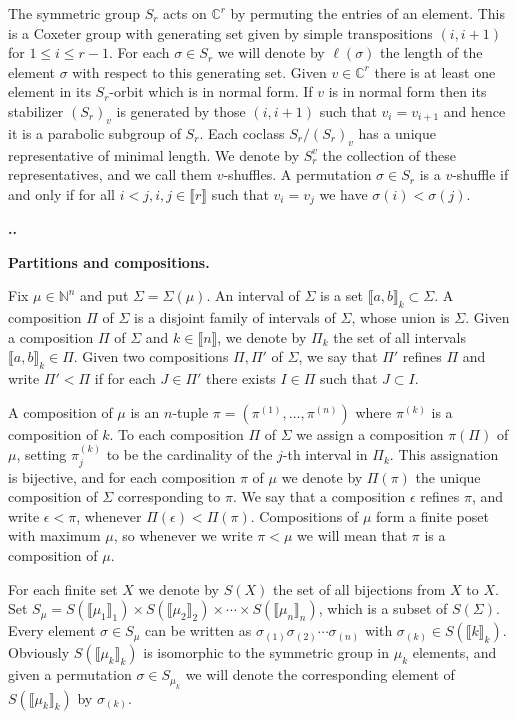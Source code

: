 \documentclass[11pt,fleqn]{amsart}
\renewcommand\thesection{\arabic{section}}
\newcounter{para}[section]
\renewcommand\thepara{\thesection.\arabic{para}}
\def\paragraph{%
 \noindent
 \refstepcounter{para}%
 \textbf{\thepara.}\hspace{1ex}%
}
\newcommand\about[1]{%
 {\bfseries#1.}%
}
\newcommand\NN{\mathbb N}
\newcommand\CC{\mathbb C}
\newcommand\interval[1]{\llbracket #1 \rrbracket}
\begin{document}
The symmetric group $S_r$ acts on $\CC^r$ by permuting the entries of an 
element. This is a Coxeter group with generating set given by simple 
transpositions $(i,i+1)$ for $1 \leq i \leq r-1$. For each $\sigma \in S_r$
we will denote by $\ell(\sigma)$ the length of the element $\sigma$ with 
respect to this generating set. Given $v \in \CC^r$ there is at least one 
element in its $S_r$-orbit which is in normal form. If $v$ is in normal form 
then its stabilizer $(S_r)_v$ is generated by those $(i,i+1)$ such that $v_i = 
v_{i+1}$ and hence it is a parabolic subgroup of $S_r$. Each coclass $S_r/
(S_r)_v$ has a unique representative of minimal length. We denote by $S_r^v$ 
the collection of these representatives, and we call them $v$-shuffles. A 
permutation $\sigma \in S_r$ is a $v$-shuffle if and only if for all $i < j, 
i,j \in \interval r$ such that $v_i = v_j$ we have $\sigma(i) < \sigma(j)$. 

\paragraph
\about{Partitions and compositions}
\label{partitions-compositions}
Fix $\mu \in \NN^n$ and put $\Sigma = \Sigma(\mu)$. An interval of $\Sigma$ is 
a set $\interval{a,b}_k \subset \Sigma$. A composition $\Pi$ of $\Sigma$ is a 
disjoint family of intervals of $\Sigma$, whose union is $\Sigma$. Given a 
composition $\Pi$ of $\Sigma$ and $k \in \interval n$, we denote by $\Pi_k$ the
set of all intervals $\interval{a,b}_k \in \Pi$. Given two compositions $\Pi, 
\Pi'$ of $\Sigma$, we say that $\Pi'$ refines $\Pi$ and write $\Pi' < \Pi$ if 
for each $J \in \Pi'$ there exists $I \in \Pi$ such that $J \subset I$. 

A composition of $\mu$ is an $n$-tuple $\pi = (\pi^{(1)}, \ldots, 
\pi^{(n)})$ where $\pi^{(k)}$ is a composition of $k$. To each
composition $\Pi$ of $\Sigma$ we assign a composition $\pi(\Pi)$ of $\mu$, 
setting $\pi^{(k)}_j$ to be the cardinality of the $j$-th interval in $\Pi_k$. 
This assignation is bijective, and for each composition $\pi$ of $\mu$ we 
denote by $\Pi(\pi)$ the unique composition of $\Sigma$ corresponding to 
$\pi$. We say that a composition $\epsilon$ refines $\pi$, and write 
$\epsilon < \pi$, whenever $\Pi(\epsilon) < \Pi(\pi)$. Compositions of $\mu$ 
form a finite poset with maximum $\mu$, so whenever we write $\pi < \mu$ we 
will mean that $\pi$ is a composition of $\mu$.

For each finite set $X$ we denote by $S(X)$ the set of all bijections from
$X$ to $X$. Set $S_\mu = S(\interval{\mu_1}_1) \times S(\interval{\mu_2}_{2}) 
\times \cdots \times S(\interval{\mu_n}_n)$, which is a subset of $S(\Sigma)$. 
Every element $\sigma \in S_\mu$ can be written as $\sigma_{(1)} \sigma_{(2)}
\cdots \sigma_{(n)}$ with $\sigma_{(k)} \in S(\interval{k}_k)$. Obviously
$S(\interval{\mu_k}_k)$ is isomorphic to the symmetric group in $\mu_k$ 
elements, and given a permutation $\sigma \in S_{\mu_k}$ we will denote the 
corresponding element of $S(\interval{\mu_k}_k)$ by $\sigma_{(k)}$. 
\end{document}
